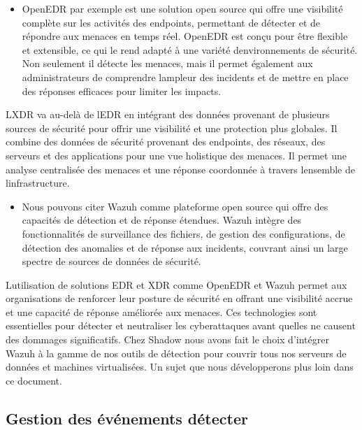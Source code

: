 \documentclass[
  11pt,
  a4paper,
  krantz2,
  11pt,
  oneside]{krantz}
\providecommand{\tightlist}{%
  \setlength{\itemsep}{0pt}\setlength{\parskip}{0pt}}
\begin{document}
\begin{itemize}
\tightlist
\item
  OpenEDR par exemple est une solution open source qui offre une visibilité complète sur les activités des endpoints, permettant de détecter et de répondre aux menaces en temps réel. OpenEDR est conçu pour être flexible et extensible, ce qui le rend adapté à une variété d\textquotesingle environnements de sécurité. Non seulement il détecte les menaces, mais il permet également aux administrateurs de comprendre l\textquotesingle ampleur des incidents et de mettre en place des réponses efficaces pour limiter les impacts.
\end{itemize}

L\textquotesingle XDR va au-delà de l\textquotesingle EDR en intégrant des données provenant de plusieurs sources de sécurité pour offrir une visibilité et une protection plus globales. Il combine des données de sécurité provenant des endpoints, des réseaux, des serveurs et des applications pour une vue holistique des menaces. Il permet une analyse centralisée des menaces et une réponse coordonnée à travers l\textquotesingle ensemble de l\textquotesingle infrastructure.

\begin{itemize}
\tightlist
\item
  Nous pouvons citer Wazuh comme plateforme open source qui offre des capacités de détection et de réponse étendues. Wazuh intègre des fonctionnalités de surveillance des fichiers, de gestion des configurations, de détection des anomalies et de réponse aux incidents, couvrant ainsi un large spectre de sources de données de sécurité.
\end{itemize}

L\textquotesingle utilisation de solutions EDR et XDR comme OpenEDR et Wazuh permet aux organisations de renforcer leur posture de sécurité en offrant une visibilité accrue et une capacité de réponse améliorée aux menaces. Ces technologies sont essentielles pour détecter et neutraliser les cyberattaques avant qu\textquotesingle elles ne causent des dommages significatifs. Chez Shadow nous avons fait le choix d'intégrer Wazuh à la gamme de nos outils de détection pour couvrir tous nos serveurs de données et machines virtualisées. Un sujet que nous développerons plus loin dans ce document.

\subsection{Gestion des événements détecter}\label{gestion-des-uxe9vuxe9nements-duxe9tecter}
\end{document}
